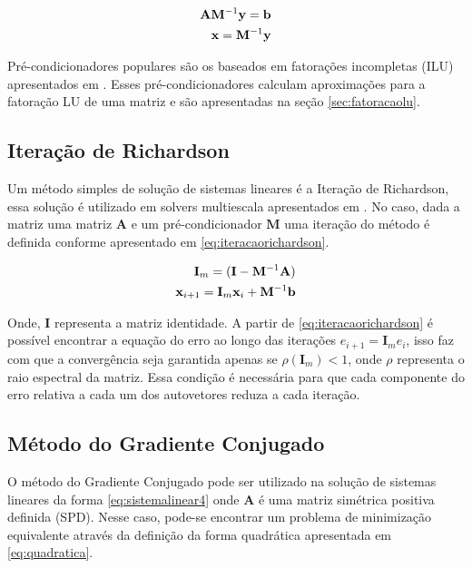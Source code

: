 \begin{align} \label{eq:precondir}
\mathbf{A} \mathbf{M}^{-1} \mathbf{y} = \mathbf{b} \\
\mathbf{x} = \mathbf{M}^{-1} \mathbf{{y}}
\end{align}


Pré-condicionadores populares são os baseados em fatorações incompletas (ILU) apresentados em \citet{ilupaper}. Esses pré-condicionadores calculam aproximações para a fatoração LU de uma matriz e são apresentadas na seção \ref{sec:fatoracaolu}.

\subsection{Iteração de Richardson}

Um método simples de solução de sistemas lineares é a Iteração de Richardson, essa solução é utilizado em solvers multiescala apresentados em \citet{msparalelo}. No caso, dada a matriz uma matriz $\mathbf{A}$ e um pré-condicionador $\mathbf{M}$ uma iteração do método é definida conforme apresentado em \eqref{eq:iteracaorichardson}.

\begin{align} \label{eq:iteracaorichardson}
\mathbf{I}_m = (\mathbf{I} - \mathbf{M}^{-1} \mathbf{A})    \\
\mathbf{x}_{i+1} = \mathbf{I}_m  \mathbf{x}_i + \mathbf{M}^{-1} \mathbf{b}  
\end{align}

Onde, $\mathbf{I}$ representa a matriz identidade. A partir de \eqref{eq:iteracaorichardson} é possível encontrar a equação do erro ao longo das iterações $e_{i+1} = \mathbf{I}_m e_i$, isso faz com que a convergência seja garantida apenas se $\rho(\mathbf{I}_m) < 1$, onde $\rho$ representa o raio espectral da matriz. Essa condição é necessária para que cada componente do erro relativa a cada  um dos autovetores reduza a cada iteração.


\subsection{Método do Gradiente Conjugado}

O método do Gradiente Conjugado pode ser utilizado na solução de sistemas lineares da forma \eqref{eq:sistemalinear4} onde $\mathbf{A}$ é uma matriz simétrica positiva definida (SPD). Nesse caso, pode-se encontrar um problema de minimização equivalente através da definição da forma quadrática apresentada em \eqref{eq:quadratica}. 

